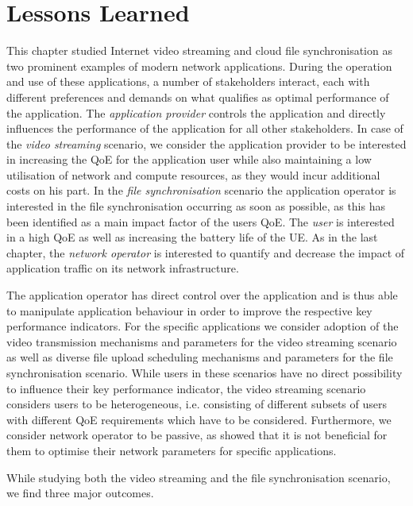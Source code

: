\section{Lessons Learned}\label{sec:application:lessons_learned}
This chapter studied Internet video streaming and cloud file synchronisation as two prominent examples of modern network applications.
During the operation and use of these applications, a number of stakeholders interact, each with different preferences and demands on what qualifies as optimal performance of the application.
The \emph{application provider} controls the application and directly influences the performance of the application for all other stakeholders.
In case of the \emph{video streaming} scenario, we consider the application provider to be interested in increasing the \gls{QoE} for the application user while also maintaining a low utilisation of network and compute resources, as they would incur additional costs on his part.
In the \emph{file synchronisation} scenario the application operator is interested in the file synchronisation occurring as soon as possible, as this has been identified as a main impact factor of the users \gls{QoE}.
The \emph{user} is interested in a high \gls{QoE} as well as increasing the battery life of the \gls{UE}.
As in the last chapter, the \emph{network operator} is interested to quantify and decrease the impact of application traffic on its network infrastructure.

The application operator has direct control over the application and is thus able to manipulate application behaviour in order to improve the respective key performance indicators.
For the specific applications we consider adoption of the video transmission mechanisms and parameters for the video streaming scenario as well as diverse file upload scheduling mechanisms and parameters for the file synchronisation scenario.
While users in these scenarios have no direct possibility to influence their key performance indicator, the video streaming scenario considers users to be heterogeneous, i.e. consisting of different subsets of users with different \gls{QoE} requirements which have to be considered.
Furthermore, we consider network operator to be passive, as  showed that it is not beneficial for them to optimise their network parameters for specific applications.

While studying both the video streaming and the file synchronisation scenario, we find three major outcomes.

